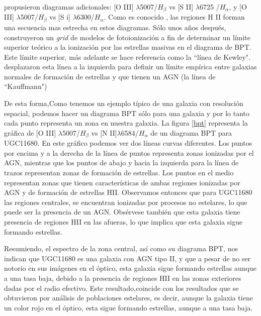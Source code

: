 \bigskip

\noindent \citet{osterbrock1987} propusieron diagramas adicionales: [O III] $\lambda$5007/$H_{\beta}$ vs
[S II] $\lambda$6725 /$H_{\alpha}$, y [O III] $\lambda$5007/$H_{\beta}$ vs [S i] $\lambda$6300/$H_{\alpha}$.
Como es conocido \citet{osterbrock1989}, las regiones H II  forman una
secuencia mas estrecha en estos diagramas. Sólo unos años después, \citet{kewley2001}  construyeron un \textsl{grid} de
modelos de fotoionización a fin de determinar un límite superior teórico
a la ionización por las estrellas masivas en el diagrama de BPT. Este límite superior,
más adelante se hace referencia como la ``línea de Kewley". \citet{kauffmann2003} desplazaron esta línea a la izquierda para definir un límite empírica entre galaxias normales de formación de estrellas y que tienen un AGN (la línea de ``Kauffmann")

\bigskip

\noindent De esta forma,Como tenemos un ejemplo típico de una galaxia  con resolución espacial, podemos hacer un diagrama BPT sólo para una galaxia y por lo tanto cada punto representa un zona en nuestra galaxia. La figura \ref{bpt} representa
la gráfica de [O III] $\lambda$5007/$H_{\beta}$ vs [N II]$\lambda$6584/$H_{\alpha}$ de un diagrama BPT para UGC11680.
En este gráfico podemos ver dos líneas curvas diferentes. Los puntos por encima y a la derecha de la línea de puntos representa
zonas ionizadas por el AGN, mientras que los puntos de abajo y hacia la izquierda para
la línea de trazos representan zonas de formación de estrellas. Los
puntos en el medio representan zonas que tienen características
de ambas regiones ionizadas por AGN  y de formación de estrellas HII. Observamos entonces que para UGC11680 las regiones centrales, se encuentran ionizadas por procesos no estelares, lo que puede ser la presencia de un AGN. Obsérvese también que esta galaxia tiene presencia de regiones HII en las afueras, lo que implica que esta galaxia sigue formando estrellas.

\bigskip

\noindent Resumiendo, el espectro de la zona central, así como su diagrama BPT, nos indican que UGC11680 es una galaxia con AGN tipo II, y que a pesar de no ser notorio en sus imágenes en el óptico, esta galaxia sigue formando estrellas aunque a una tasa baja, debido a la presencia de regiones HII en las zonas exteriores dadas por el radio efectivo. Este resultado,coincide con los resultados que se obtuvieron por análisis de poblaciones estelares, es decir, aunque la galaxia tiene un color rojo en el óptico, esta sigue formando estrellas, aunque a una tasa baja.

